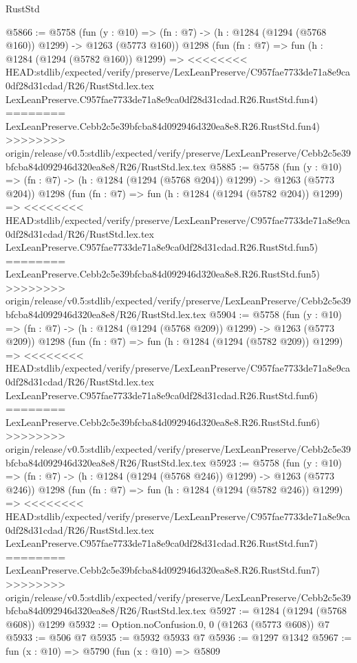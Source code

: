 \begin{lexlean}{RustStd}
\begin{coremodule}
{\begin{coremodule}
{{{{{{{{{{{{@5866 := @5758
    (fun (y : @10) => (fn : @7) -> (h : @1284 (@1294 (@5768 @160)) @1299) -> @1263 (@5773 @160))
    @1298
    (fun (fn : @7) =>
    fun (h : @1284 (@1294 (@5782 @160)) @1299) =>
<<<<<<<< HEAD:stdlib/expected/verify/preserve/LexLeanPreserve/C957fae7733de71a8e9ca0df28d31cdad/R26/RustStd.lex.tex
    LexLeanPreserve.C957fae7733de71a8e9ca0df28d31cdad.R26.RustStd.fun4)
========
    LexLeanPreserve.Cebb2c5e39bfcba84d092946d320ea8e8.R26.RustStd.fun4)
>>>>>>>> origin/release/v0.5:stdlib/expected/verify/preserve/LexLeanPreserve/Cebb2c5e39bfcba84d092946d320ea8e8/R26/RustStd.lex.tex
@5885 := @5758
    (fun (y : @10) => (fn : @7) -> (h : @1284 (@1294 (@5768 @204)) @1299) -> @1263 (@5773 @204))
    @1298
    (fun (fn : @7) =>
    fun (h : @1284 (@1294 (@5782 @204)) @1299) =>
<<<<<<<< HEAD:stdlib/expected/verify/preserve/LexLeanPreserve/C957fae7733de71a8e9ca0df28d31cdad/R26/RustStd.lex.tex
    LexLeanPreserve.C957fae7733de71a8e9ca0df28d31cdad.R26.RustStd.fun5)
========
    LexLeanPreserve.Cebb2c5e39bfcba84d092946d320ea8e8.R26.RustStd.fun5)
>>>>>>>> origin/release/v0.5:stdlib/expected/verify/preserve/LexLeanPreserve/Cebb2c5e39bfcba84d092946d320ea8e8/R26/RustStd.lex.tex
@5904 := @5758
    (fun (y : @10) => (fn : @7) -> (h : @1284 (@1294 (@5768 @209)) @1299) -> @1263 (@5773 @209))
    @1298
    (fun (fn : @7) =>
    fun (h : @1284 (@1294 (@5782 @209)) @1299) =>
<<<<<<<< HEAD:stdlib/expected/verify/preserve/LexLeanPreserve/C957fae7733de71a8e9ca0df28d31cdad/R26/RustStd.lex.tex
    LexLeanPreserve.C957fae7733de71a8e9ca0df28d31cdad.R26.RustStd.fun6)
========
    LexLeanPreserve.Cebb2c5e39bfcba84d092946d320ea8e8.R26.RustStd.fun6)
>>>>>>>> origin/release/v0.5:stdlib/expected/verify/preserve/LexLeanPreserve/Cebb2c5e39bfcba84d092946d320ea8e8/R26/RustStd.lex.tex
@5923 := @5758
    (fun (y : @10) => (fn : @7) -> (h : @1284 (@1294 (@5768 @246)) @1299) -> @1263 (@5773 @246))
    @1298
    (fun (fn : @7) =>
    fun (h : @1284 (@1294 (@5782 @246)) @1299) =>
<<<<<<<< HEAD:stdlib/expected/verify/preserve/LexLeanPreserve/C957fae7733de71a8e9ca0df28d31cdad/R26/RustStd.lex.tex
    LexLeanPreserve.C957fae7733de71a8e9ca0df28d31cdad.R26.RustStd.fun7)
========
    LexLeanPreserve.Cebb2c5e39bfcba84d092946d320ea8e8.R26.RustStd.fun7)
>>>>>>>> origin/release/v0.5:stdlib/expected/verify/preserve/LexLeanPreserve/Cebb2c5e39bfcba84d092946d320ea8e8/R26/RustStd.lex.tex
@5927 := @1284 (@1294 (@5768 @608)) @1299
@5932 := Option.noConfusion.{0, 0} (@1263 (@5773 @608)) @7
@5933 := @506 @7
@5935 := @5932 @5933 @7
@5936 := @1297 @1342
@5967 := fun (x : @10) =>
  @5790
    (fun (x : @10) =>
    @5809
}}}}}}}}}}}}
\end{coremodule}}
\end{coremodule}
\end{lexlean}
